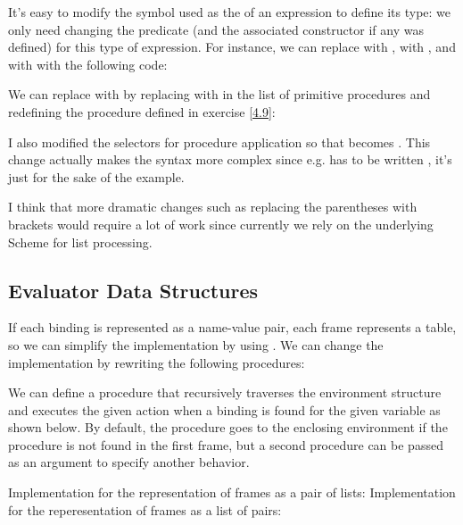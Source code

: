\begin{exe}[4.10]
    It’s easy to modify the symbol used as the  of an expression to 
    define its type: we only need changing the predicate (and the associated 
    constructor if any was defined) for this type of expression. For instance, 
    we can replace  with ,  with \vscm{&&}, and 
     with \vscm{||} with the following code:

    We can replace  with \vscm{!} by replacing
     with  in the list of primitive 
    procedures and redefining the  procedure defined in exercise 
    \ref{4.9}:

    I also modified the selectors for procedure application so that
     becomes . This change actually makes 
    the syntax more complex since e.g.  has to be written 
    , it’s just for the sake of the example.

    I think that more dramatic changes such as replacing the parentheses with 
    brackets would require a lot of work since currently we rely on the 
    underlying Scheme for list processing.
\end{exe}

\subsection{Evaluator Data Structures}

\begin{exe}[4.11]
    If each binding is represented as a name-value pair, each frame represents 
    a table, so we can simplify the implementation by using . We can 
    change the implementation by rewriting the following procedures:
\end{exe}

\begin{exe}[4.12]
    \label{4.12}
    We can define a procedure that recursively traverses the environment 
    structure and executes the given action when a binding is found for the 
    given variable as shown below. By default, the procedure goes to the 
    enclosing environment if the procedure is not found in the first frame, but 
    a second procedure can be passed as an argument to specify another behavior.

    Implementation for the representation of frames as a pair of lists:
    Implementation for the reperesentation of frames as a list of pairs:
\end{exe}


